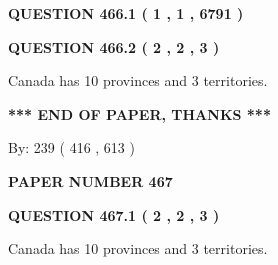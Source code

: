 \documentclass[12pt]{article}
\begin{document}
   
  
\vspace{0.2in}
  
{\textbf{\Large{QUESTION
466.1 
 ( 1 , 1 , 6791 )
}}}
  
  
  
\vspace{0.2in}
  
{\textbf{\Large{QUESTION
466.2 
 ( 2 , 2 , 3 )
}}}
  
  
 
 
\noindent{}
 
 
Canada has 10  provinces and 3 territories.
 
 
 
 
   
   
 \vspace{0.2in}
 
   
   
   
   
\vspace{1.0in} 
{\textbf{\large{ *** END OF PAPER, THANKS *** }}} 
   
   
\hspace{1.0in} By: 
 239 ( 416 ,  613 )
   
   
   
   
\newpage 
\setcounter{page}{ 
   467001 } 
   
   
   
   
 {\textbf{ \Large{ PAPER NUMBER  467  }}}
   
   
\vspace{0.2in}
   
   
   
   
   
   
 \vspace{0.2in}
 
 
 
 
   
   
  
\vspace{0.2in}
  
{\textbf{\Large{QUESTION
467.1 
 ( 2 , 2 , 3 )
}}}
  
  
 
 
\noindent{}
 
 
Canada has 10  provinces and 3 territories.
 
\end{document}
